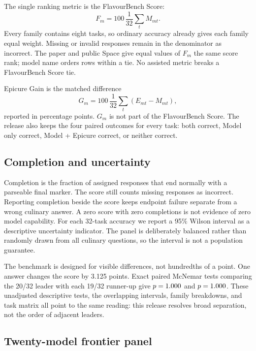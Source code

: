 \documentclass{article}
\begin{document}
The single ranking metric is the FlavourBench Score:
\begin{equation}
 F_m = 100\,\frac{1}{32}\sum_t M_{mt}.
 \label{eq:score}
\end{equation}
Every family contains eight tasks, so ordinary accuracy already gives each family equal weight.
Missing or invalid responses remain in the denominator as incorrect. The paper and public Space
give equal values of $F_m$ the same score rank; model name orders rows within a tie. No assisted
metric breaks a FlavourBench Score tie.

Epicure Gain is the matched difference
\begin{equation}
 G_m = 100\,\frac{1}{32}\sum_t\left(E_{mt}-M_{mt}\right),
 \label{eq:uplift}
\end{equation}
reported in percentage points. $G_m$ is not part of the FlavourBench Score. The release also keeps
the four paired outcomes for every task: both correct, Model only correct, Model + Epicure correct,
or neither correct.

\subsection{Completion and uncertainty}

Completion is the fraction of assigned responses that end normally with a parseable final marker.
The score still counts missing responses as incorrect. Reporting completion beside the score keeps
endpoint failure separate from a wrong culinary answer. A zero score with zero completions is not
evidence of zero model capability. For each 32-task accuracy we report a 95\% Wilson interval as a
descriptive uncertainty indicator. The panel is deliberately balanced rather than randomly drawn
from all culinary questions, so the interval is not a population guarantee.

The benchmark is designed for visible differences, not hundredths of a point. One answer changes
the score by 3.125 points. Exact paired McNemar tests comparing the 20/32 leader with each 19/32
runner-up give $p=1.000{}$ and $p=1.000{}$. These unadjusted descriptive tests,
the overlapping intervals, family breakdowns, and task matrix all point to the same reading: this
release resolves broad separation, not the order of adjacent leaders.

\subsection{Twenty-model frontier panel}
\end{document}
